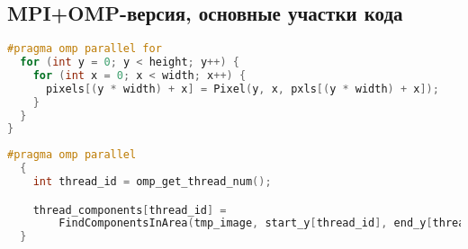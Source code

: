 \documentclass[12pt]{article}
\begin{document}
\subsection{MPI+OMP-версия, основные участки кода}
\label{appendix:mpi_1}
\begin{lstlisting}[language=C++, caption={MPI+OMP-версия, Создание объекта Image в конструкторе Image::Image()}]
#pragma omp parallel for
  for (int y = 0; y < height; y++) {
    for (int x = 0; x < width; x++) {
      pixels[(y * width) + x] = Pixel(y, x, pxls[(y * width) + x]);
    }
  }
}
\end{lstlisting}
\label{appendix:mpi_2}
\begin{lstlisting}[language=C++, caption={MPI+OMP-версия, Поиск компонент по "полосам" изображения в функции FindComponentsOMP()}]
#pragma omp parallel
  {
    int thread_id = omp_get_thread_num();

    thread_components[thread_id] =
        FindComponentsInArea(tmp_image, start_y[thread_id], end_y[thread_id], index_offset[thread_id]);
  }
\end{lstlisting}
\label{appendix:mpi_3}
\end{document}
